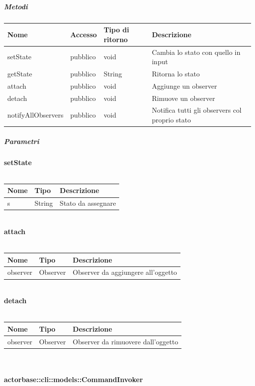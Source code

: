 \documentclass{scalatekids-article}
\begin{document}
\subparagraph{Metodi}

\begin{tabular}{| l | l | l | l |}
  \hline
  Nome & Accesso & Tipo di ritorno & Descrizione\\
  \hline
  setState & pubblico & void & Cambia lo stato con quello in input\\
  \hline
  getState & pubblico & String & Ritorna lo stato\\
  \hline
  attach & pubblico & void & Aggiunge un observer\\
  \hline
  detach & pubblico & void & Rimuove un observer\\
  \hline
  notifyAllObservers & pubblico & void & Notifica tutti gli observers col proprio stato\\
  \hline
\end{tabular}

\subparagraph{Parametri}

\textbf{setState}\\ \\
\begin{tabular}{| p{3cm} | p{3.5cm} | p{8.5cm} |}
  \hline
  Nome & Tipo & Descrizione\\
  \hline
  s & String & Stato da assegnare\\
  \hline
\end{tabular}\\

\textbf{attach}\\ \\
\begin{tabular}{| p{3cm} | p{3.5cm} | p{8.5cm} |}
  \hline
  Nome & Tipo & Descrizione\\
  \hline
  observer & Observer & Observer da aggiungere all'oggetto\\
  \hline
\end{tabular}\\

\textbf{detach}\\ \\
\begin{tabular}{| p{3cm} | p{3.5cm} | p{8.5cm} |}
  \hline
  Nome & Tipo & Descrizione\\
  \hline
  observer & Observer & Observer da rimuovere dall'oggetto\\
  \hline
\end{tabular}\\

\paragraph{actorbase::cli::models::CommandInvoker}
\label{sec:actorbase::cli::models::CommandInvoker}
\end{document}
